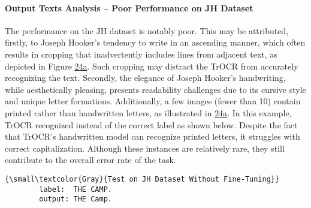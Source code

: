 \paragraph*{Output Texts Analysis -- Poor Performance on JH Dataset}
The performance on the JH dataset is notably poor. This may be attributed, firstly, to Joseph Hooker's tendency to write in an ascending manner, which often results in cropping that inadvertently includes lines from adjacent text, as depicted in Figure \hyperref[fig:5_ascend_]{24a}. Such cropping may distract the TrOCR from accurately recognizing the text. Secondly, the elegance of Joseph Hooker's handwriting, while aesthetically pleasing, presents readability challenges due to its cursive style and unique letter formations. Additionally, a few images (fewer than 10) contain printed rather than handwritten letters, as illustrated in \hyperref[fig:5_the_camp_]{24a}. In this example, TrOCR recognized  instead of the correct label  as shown below. Despite the fact that TrOCR's handwritten model can recognize printed letters, it struggles with correct capitalization. Although these instances are relatively rare, they still contribute to the overall error rate of the task.

\begin{center}
    \begin{minipage}{0.7\textwidth}
    \begin{Verbatim}[commandchars=\\\{\}]
        {\small\textcolor{Gray}{Test on JH Dataset Without Fine-Tuning}}
        label:  THE CAMP.
        output: THE Camp.
    \end{Verbatim}
    \end{minipage}
\end{center}


